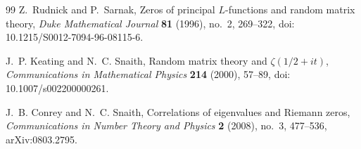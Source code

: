 \documentclass[11pt]{amsart}
\numberwithin{equation}{section}
\theoremstyle{plain}
\theoremstyle{definition}
\theoremstyle{remark}
\begin{document}
\begin{thebibliography}{99}
Z.~Rudnick and P.~Sarnak,
Zeros of principal \(L\)-functions and random matrix theory,
\emph{Duke Mathematical Journal} \textbf{81} (1996), no.~2, 269--322,
doi: 10.1215/S0012-7094-96-08115-6.

J.~P. Keating and N.~C. Snaith,
Random matrix theory and \(\zeta(1/2+it)\),
\emph{Communications in Mathematical Physics} \textbf{214} (2000), 57--89,
doi: 10.1007/s002200000261.

J.~B. Conrey and N.~C. Snaith,
Correlations of eigenvalues and Riemann zeros,
\emph{Communications in Number Theory and Physics} \textbf{2} (2008), no.~3, 477--536,
arXiv:0803.2795.

\end{thebibliography}
\end{document}
